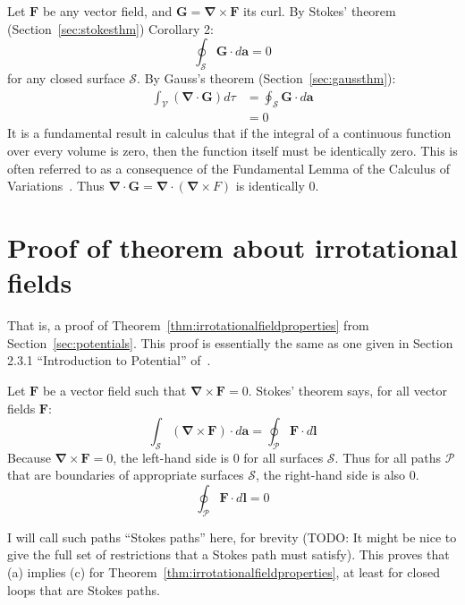 \documentclass[a4paper]{article}
\theoremstyle{plain}
\theoremstyle{definition}
\newcommand{\vect}[1]{\textbf{#1}}
\newcommand{\del}{\bm{\nabla}}
\begin{document}
Let $\vect{F}$ be any vector field, and $\vect{G} = \del \times
\vect{F}$ its curl.
By Stokes' theorem (Section~\ref{sec:stokesthm}) Corollary 2:
\begin{equation}
\oint_{\mathcal{S}} \vect{G} \cdot d\vect{a} = 0
\end{equation}
for any closed surface $\mathcal{S}$.
By Gauss's theorem (Section~\ref{sec:gaussthm}):
\begin{align*}
\int_{\mathcal{V}} (\del \cdot \vect{G}) d\tau
    & = \oint_{\mathcal{S}} \vect{G} \cdot d\vect{a} \\
    & = 0
\end{align*}
It is a fundamental result in calculus that if the integral of a
continuous function over every volume is zero, then the function
itself must be identically zero.  This is often referred to as a
consequence of the Fundamental Lemma of the Calculus of
Variations~\cite{FundamentalLemmaCalculusOfVariations}.
Thus $\del \cdot \vect{G} = \del \cdot (\del \times F)$ is identically
0.


\section{Proof of theorem about irrotational fields}
\label{sec:potentialsthm1}

That is, a proof of Theorem~\ref{thm:irrotationalfieldproperties} from
Section~\ref{sec:potentials}.
This proof is essentially the same as one given in Section 2.3.1
``Introduction to Potential'' of~\cite{Griffiths1998}.

Let $\vect{F}$ be a vector field such that $\del \times \vect{F} = 0$.
Stokes' theorem says, for all vector fields $\vect{F}$:
\begin{equation}
\int_{\mathcal{S}} (\del \times \vect{F}) \cdot d\vect{a} = \oint_{\mathcal{P}} \vect{F} \cdot d\vect{l} \nonumber
\end{equation}
Because $\del \times \vect{F} = 0$, the left-hand side is 0 for all
surfaces $\mathcal{S}$.  Thus for all paths $\mathcal{P}$ that are
boundaries of appropriate surfaces $\mathcal{S}$, the right-hand side
is also 0.
\begin{equation}
\oint_{\mathcal{P}} \vect{F} \cdot d\vect{l} = 0 \label{eq:thm1allpathintegrals0}
\end{equation}

I will call such paths ``Stokes paths'' here, for brevity (TODO: It
might be nice to give the full set of restrictions that a Stokes path
must satisfy).
This proves that (a) implies (c) for
Theorem~\ref{thm:irrotationalfieldproperties}, at least for closed
loops that are Stokes paths.
\end{document}

